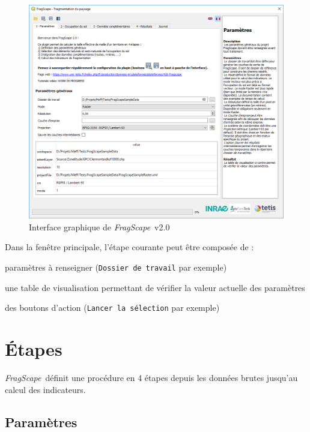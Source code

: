 \documentclass[11pt]{article}
\newcommand{\source}[1]{\vspace*{-0.4cm}\caption*{\textit{Source: {#1}}}}
\newcommand{\tool}{\emph{FragScape}}
\let\tempone\itemize
\let\temptwo\enditemize
\renewenvironment{itemize}{\tempone\addtolength{\itemsep}{-0.5\baselineskip}}{\temptwo}
\begin{document}
\begin{figure}[h!]
    \centering
    \includegraphics[scale=0.68]{pictures/paramsTabFr_v2.png}
    \caption{Interface graphique de \tool\ v2.0}
    \label{fig:paramsTab}
\end{figure}

Dans la fenêtre principale, l'étape courante peut être composée de :
\begin{itemize}
    \item paramètres à renseigner (\texttt{Dossier de travail} par exemple)
    \item une table de visualisation permettant de vérifier la valeur actuelle des paramètres
    \item des boutons d'action (\texttt{Lancer la sélection} par exemple)
\end{itemize}

\pagebreak

\section{Étapes}
\label{sec:steps}

\tool\ définit une procédure en 4 étapes depuis les données brutes jusqu'au calcul des indicateurs.

\subsection{Paramètres}
\end{document}

